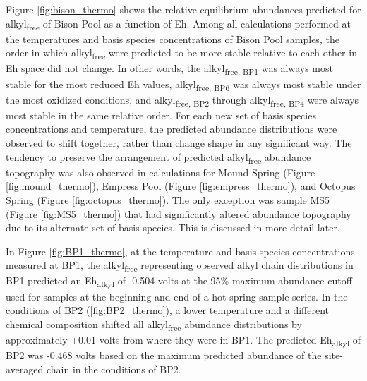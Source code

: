 Figure \ref{fig:bison_thermo} shows the relative equilibrium abundances predicted for alkyl\textsubscript{free} of Bison Pool as a function of Eh. Among all calculations performed at the temperatures and basis species concentrations of Bison Pool samples, the order in which alkyl\textsubscript{free} were predicted to be more stable relative to each other in Eh space did not change. In other words, the alkyl\textsubscript{free, BP1} was always most stable for the most reduced Eh values, alkyl\textsubscript{free, BP6} was always most stable under the most oxidized conditions, and alkyl\textsubscript{free, BP2} through alkyl\textsubscript{free, BP4} were always most stable in the same relative order. For each new set of basis species concentrations and temperature, the predicted abundance distributions were observed to shift together, rather than change shape in any significant way. The tendency to preserve the arrangement of predicted alkyl\textsubscript{free} abundance topography was also observed in calculations for Mound Spring (Figure \ref{fig:mound_thermo}), Empress Pool (Figure \ref{fig:empress_thermo}), and Octopus Spring (Figure \ref{fig:octopus_thermo}). The only exception was sample MS5 (Figure \ref{fig:MS5_thermo}) that had significantly altered abundance topography due to its alternate set of basis species. This is discussed in more detail later.


In Figure \ref{fig:BP1_thermo}, at the temperature and basis species concentrations measured at BP1, the alkyl\textsubscript{free} representing observed alkyl chain distributions in BP1 predicted an Eh\textsubscript{alkyl} of -0.504 volts at the 95\% maximum abundance cutoff used for samples at the beginning and end of a hot spring sample series. In the conditions of BP2 (\ref{fig:BP2_thermo}), a lower temperature and a different chemical composition shifted all alkyl\textsubscript{free} abundance distributions by approximately +0.01 volts from where they were in BP1. The predicted Eh\textsubscript{alkyl} of BP2 was -0.468 volts based on the maximum predicted abundance of the site-averaged chain in the conditions of BP2.

